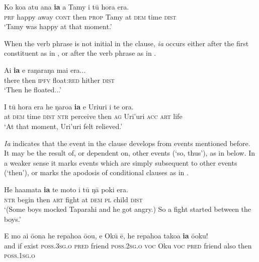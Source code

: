 \ea\label{ex:4.170}
\gll Ko koa atu {\ꞌ}ana \textbf{ia} a Tamy {\ꞌ}i tū hora era. \\
\textsc{prf} happy away \textsc{cont} then \textsc{prop} Tamy at \textsc{dem} time \textsc{dist} \\

\glt
‘Tamy was happy at that moment.’ \textstyleExampleref{[R315.300]} 
\z

When the verb phrase is not initial in the clause, \textit{ia} occurs either after the first constituent as in , or after the verb phrase as in . 

\ea\label{ex:4.171}
\gll {\ꞌ}Ai \textbf{ia} e raŋaraŋa mai era... \\
there then \textsc{ipfv} float:\textsc{red} hither \textsc{dist} \\

\glt 
‘Then he floated...’ \textstyleExampleref{[R108.117]} 
\z

\ea\label{ex:4.172}
\gll {\ꞌ}I tū hora era he ŋaro{\ꞌ}a \textbf{ia} e {\ꞌ}Uri{\ꞌ}uri i te ora. \\
at \textsc{dem} time \textsc{dist} \textsc{ntr} perceive then \textsc{ag} Uri’uri \textsc{acc} \textsc{art} life \\

\glt
‘At that moment, Uri’uri felt relieved.’ \textstyleExampleref{[R536.074]} 
\z

\textit{Ia} indicates that the event in the clause develops from events mentioned before. It may be the result of, or dependent on, other events (‘so, thus’), as in  below. In a weaker sense it marks events which are simply subsequent to other events (‘then’), or marks the apodosis of conditional clauses as in .

\ea\label{ex:4.173}
\gll He ha{\ꞌ}amata \textbf{ia} te moto {\ꞌ}i tū ŋā poki era. \\
\textsc{ntr} begin then \textsc{art} fight at \textsc{dem} \textsc{pl} child \textsc{dist} \\

\glt 
‘(Some boys mocked Taparahi and he got angry.) So a fight started between the boys.’ \textstyleExampleref{[R250.013]} 
\z

\ea\label{ex:4.174}
\gll {\ꞌ}E mo ai ō{\ꞌ}ona he repahoa ō{\ꞌ}ou, e Okū ē,  he repahoa tako{\ꞌ}a \textbf{ia} ō{\ꞌ}oku!\\
and if exist \textsc{poss.3sg.o} \textsc{pred} friend \textsc{poss.2sg.o} \textsc{voc} Oku \textsc{voc}  \textsc{pred} friend also then \textsc{poss.1sg.o}\\

